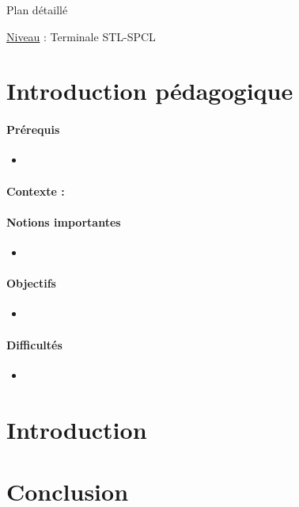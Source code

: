 \begin{reportBlock}{Plan détaillé}

\underline{Niveau} : Terminale STL-SPCL \\

\section*{Introduction pédagogique}


\paragraph*{Prérequis}
\begin{itemize}
\item 
\end{itemize}
\paragraph*{Contexte :}


\paragraph*{Notions importantes}

\begin{itemize}
\item 
\end{itemize}

\paragraph*{Objectifs}

\begin{itemize}
\item 
\end{itemize}

\paragraph*{Difficultés}

\begin{itemize}
\item 
\end{itemize}

\section*{Introduction}

\section{}

\section{Conclusion} 

\end{reportBlock}